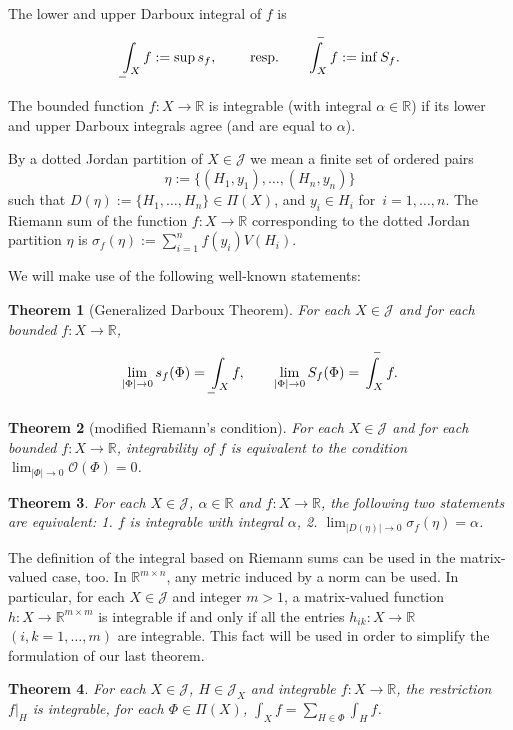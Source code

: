 \documentclass{article}
\newtheorem{theorem}{Theorem}
\newcommand{\R}{\ensuremath{\mathbb R}}
\newcommand{\J}{\mathscr{J}}
\newcommand{\OO}{\mathscr{O}}
\newcommand{\ol}{\overline}
\begin{document}
\noindent The lower and upper Darboux integral of $f$ is
\[\sideset{}{_X}\int\limits_{\ol{\phantom{J}}\ \ \ } f:=\sup
s_f,\qquad\mbox{ resp.}\qquad \sideset{}{_X}\int\limits^{\ \ -}
f:=\inf S_f.\]
The bounded function $f\colon X\to\R$ is integrable
(with integral $\alpha\in\R$) if its lower and upper Darboux
integrals agree (and are equal to $\alpha$).

\vspace{1mm} By a dotted Jordan partition of $X\in\J$ we mean a
finite set of ordered pairs
\[\eta:=\{(H_1,y_1),\ldots,(H_n,y_n)\}\] such that
$D(\eta):=\{H_1,\ldots,H_n\}\in\Pi(X)$, and $y_i\in H_i$ for
$\,i=1,\ldots,n$. The Riemann sum of the function $f\colon X\to
\R$ corresponding to the dotted Jordan partition $\eta$ is
$\sigma_f(\eta):=\sum_{i=1}^nf(y_i)V(H_i)$.

We will make use of the following well-known statements:

\begin{theorem}[Generalized Darboux Theorem]\label{Darb}
For each $X\in\J$ and for each boun\-ded $f\colon X\to\R$,
\[\lim_{|\Phi|\to0}s_f(\Phi)=\sideset{}{_X}\int\limits_{\ol{\phantom{J}}\ \ \ } f,\qquad
\lim_{|\Phi|\to0}S_f(\Phi)=\sideset{}{_X}\int\limits^{\ \ -} f.\]
\end{theorem}

\begin{theorem}[modified Riemann's condition]\label{oszc}
For each $X\in\J$ and for each bounded $f\colon X\to\R$, integrability of
$f$ is equivalent to the condition $\lim_{|\Phi|\to0}\OO(\Phi)=0$.
\end{theorem}

\begin{theorem}\label{Rdef}
For each $X\in\J$, $\alpha\in\R$ and $f\colon X\to\R$, the
following two statements are equivalent: 1. $f$ is integrable with
integral $\alpha$, 2. $\lim_{|D(\eta)|\to0}\sigma_f(\eta)=\alpha$.
\end{theorem}

The definition of the integral based on Riemann sums can be used
in the matrix-valued case, too. In $\R^{m\times n}$, any metric
induced by a norm can be used. In particular, for each $X\in\J$
and integer $m>1$, a matrix-valued function $h\colon
X\to\R^{m\times m}$ is integrable if and only if all the entries
$h_{ik}\colon X\to\R$ $(i,k=1,\ldots,m)$ are integrable. This fact
will be used in order to simplify the formulation of our last
theorem.

\begin{theorem}\label{addi}
For each $X\in\J$, $H\in\J_X$ and integrable $f\colon X\to\R$, the
restriction $f\vert_H$ is integrable, for each $\Phi\in\Pi(X)$,
$\int_Xf=\sum_{H\in\Phi}\int_Hf$.
\end{theorem}
\end{document}
